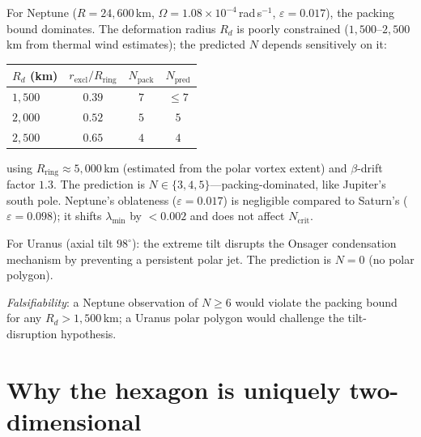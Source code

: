 For Neptune ($R = 24{,}600$\,km,
$\Omega = 1.08 \times 10^{-4}$\,rad\,s$^{-1}$,
$\varepsilon = 0.017$), the packing bound dominates.
The deformation radius $R_d$ is poorly constrained
($1{,}500$--$2{,}500$\,km from thermal wind estimates);
the predicted $N$ depends sensitively on it:
\begin{center}
\small
\begin{tabular}{lccc}
\toprule
$R_d$ (km) & $r_{\mathrm{excl}}/R_{\mathrm{ring}}$ &
  $N_{\mathrm{pack}}$ & $N_{\mathrm{pred}}$ \\
\midrule
$1{,}500$ & $0.39$ & $7$ & $\le 7$ \\
$2{,}000$ & $0.52$ & $5$ & $5$ \\
$2{,}500$ & $0.65$ & $4$ & $4$ \\
\bottomrule
\end{tabular}
\end{center}
\noindent
using $R_{\mathrm{ring}} \approx 5{,}000$\,km (estimated from
the polar vortex extent) and $\beta$-drift factor $1.3$.
The prediction is $N \in \{3, 4, 5\}$---packing-dominated,
like Jupiter's south pole.
Neptune's oblateness ($\varepsilon = 0.017$) is negligible
compared to Saturn's ($\varepsilon = 0.098$); it shifts
$\lambda_{\min}$ by $< 0.002$ and does not affect $N_{\mathrm{crit}}$.

\smallskip
\noindent
For Uranus (axial tilt $98^\circ$): the extreme tilt
disrupts the Onsager condensation mechanism by preventing a
persistent polar jet.
The prediction is $N = 0$ (no polar polygon).

\smallskip
\noindent
\emph{Falsifiability}: a Neptune observation of $N \ge 6$
would violate the packing bound for any $R_d > 1{,}500$\,km;
a Uranus polar polygon would challenge the tilt-disruption
hypothesis.

\section{Why the hexagon is uniquely two-dimensional}
\label{sec:uniquely-2d}

